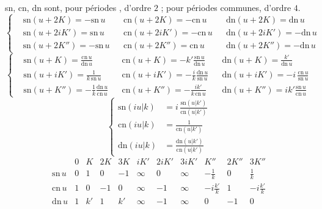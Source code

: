 \documentclass[11pt,a4paper]{article}
\begin{document}
sn, cn, dn sont, pour  périodes , d'ordre $2$ ; pour
 périodes communes, d'ordre $4$.
\[
\left\lbrace
\begin{aligned}
&\mathrm{sn}(u+2K) = -\mathrm{sn}\,u && \mathrm{cn}(u+2K) = -\mathrm{cn}\,u
&& \mathrm{dn}(u+2K) = \mathrm{dn}\,u\\
&\mathrm{sn}(u+2iK') = \mathrm{sn}\,u && \mathrm{cn}(u+2iK') = -\mathrm{cn}\,u
&& \mathrm{dn}(u+2iK') = -\mathrm{dn}\,u\\
&\mathrm{sn}(u+2K'') = -\mathrm{sn}\,u && \mathrm{cn}(u+2K'') = \mathrm{cn}\,u
&& \mathrm{dn}(u+2K'') = -\mathrm{dn}\,u
\end{aligned}
\right.
\]
\[
\left\lbrace
\begin{aligned}
&\mathrm{sn}(u+K) = \frac{\mathrm{cn}\,u}{\mathrm{dn}\,u}
&& \mathrm{cn}(u+K) = -k'\frac{\mathrm{sn}\,u}{\mathrm{dn}\,u}
&& \mathrm{dn}(u+K) = \frac{k'}{\mathrm{dn}\,u}\\
&\mathrm{sn}(u+iK') = \frac{1}{k\,\mathrm{sn}\,u}
&& \mathrm{cn}(u+iK') = -\frac{i}{k}\frac{\mathrm{dn}\,u}{\mathrm{sn}\,u}
&& \mathrm{dn}(u+iK') = -i\,\frac{\mathrm{cn}\,u}{\mathrm{sn}\,u}\\
&\mathrm{sn}(u+K'') = -\frac{1}{k}\frac{\mathrm{dn}\,u}{\mathrm{cn}\,u}
&& \mathrm{cn}(u+K'') = -\frac{ik'}{k\,\mathrm{cn}\,u}
&& \mathrm{dn}(u+K'') = ik'\frac{\mathrm{sn}\,u}{\mathrm{cn}\,u}
\end{aligned}
\right.
\]
\[
\left\lbrace
\begin{aligned}
\mathrm{sn}(iu|k) &= i\,\frac{\mathrm{sn}(u|k')}{\mathrm{cn}(u|k')}\\
\mathrm{cn}(iu|k) &= \frac{1}{\mathrm{cn}(u|k')}\\
\mathrm{dn}(iu|k) &= \frac{\mathrm{dn}(u|k')}{\mathrm{cn}(u|k')}
\end{aligned}
\right.
\]
\[
\begin{array}{c|c|c|c|c|c|c|c|c|c|c}
 & 0 & K & 2K & 3K & iK' & 2iK' & 3iK' & K'' & 2K'' & 3K''\\
\hline
\mathrm{sn}\,u & 0 & 1 & 0 & -1 & \infty & 0 & \infty & -\frac1k & 0 & \frac1k\\
\mathrm{cn}\,u & 1 & 0 & -1 & 0 & \infty & -1 & \infty & -i\frac{k'}{k} & 1 & -i\frac{k'}{k}\\
\mathrm{dn}\,u & 1 & k' & 1 & k' & \infty & -1 & \infty & 0 & -1 & 0
\end{array}
\]
\end{document}
